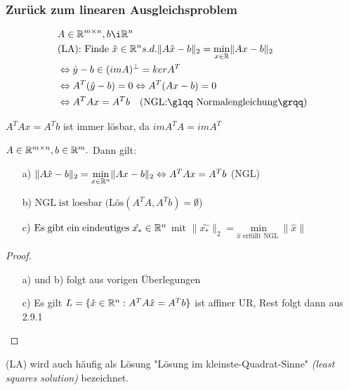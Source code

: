 \subsubsection{Zurück zum linearen Ausgleichsproblem}
\begin{align*}
&A \in \RR^{m \times n}, b \i \RR^n\\
&\text{(LA): Finde } \hat{x} \in \RR^n s.d. \|A\hat{x}-b\|_2 = \underset{x \in \RR}{\mathrm{min}}\|Ax-b\|_2\\
&\Leftrightarrow \hat{y}-b \in (im A)^{\perp} = ker A^T\\
&\Leftrightarrow A^T(\hat{y}-b)=0 \Leftrightarrow A^T(Ax-b)=0\\
&\Leftrightarrow A^TAx=A^Tb \quad \text{(NGL:\glqq Normalengleichung\grqq)}
\end{align*}
\begin{Bemerkung}
$A^TAx=A^Tb$ ist immer lösbar, da $im A^TA=im A^T$
\end{Bemerkung}
\begin{Satz}
$A \in \mathbb R^{m \times n}, b \in \mathbb R^m.$ Dann gilt:
\begin{itemize}
\item[a)]$\|A\hat{x}-b\|_2= \underset{x \in \mathbb R^n}{\mathrm{min}}\|Ax-b\|_2 \Leftrightarrow A^TAx=A^Tb$ (NGL)
\item[b)] $\mathrm{NGL\;ist\;loesbar\;} (\text{Lös}(A^TA,A^Tb) = \emptyset$)
\item[c)] $\mathrm{Es\;gibt\;ein\;eindeutiges\;} \hat{x_{*}} \in \mathbb R^n$ mit $ \|\hat{x_{*}}\|_2 = \underset{\hat{x} \text{ erfüllt NGL }}{\mathrm{min}}\|\hat{x}\|$
\end{itemize}
\end{Satz}
\begin{proof}
	\begin{itemize}
		\item[a) und b)] folgt aus vorigen Überlegungen
		\item[c)] Es gilt $L=\{\hat{x}\in \mathbb R^n:A^TA\hat{x}=A^Tb\}$ ist affiner UR, Rest folgt dann aus 2.9.1
	\end{itemize}
\end{proof}
\begin{Bemerkung}
	(LA) wird auch häufig als Lösung "Lösung im kleinste-Quadrat-Sinne"
	\textit{(least squares solution)} bezeichnet. 
\end{Bemerkung}
